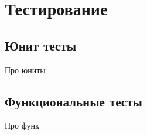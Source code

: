 \section{Тестирование}
\subsection{Юнит тесты}
Про юниты

\subsection{Функциональные тесты}
Про функ

\pagebreak
